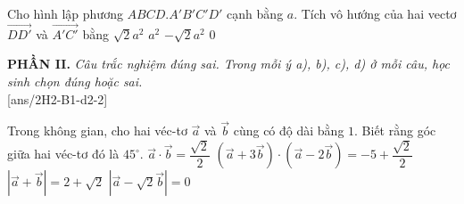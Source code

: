 \begin{ex}
	Cho hình lập phương $ABCD.A'B'C'D'$ cạnh bằng $a$. Tích vô hướng của hai vectơ $\vec{DD'}$ và $\vec{A'C'}$ bằng
	\choice
	{$\sqrt{2}a^2$}
	{$a^2$}
	{$-\sqrt{2}a^2$}
	{\True $0$}
\end{ex}
\textbf{PHẦN II.} \textit{Câu trắc nghiệm đúng sai. Trong mỗi ý a), b), c), d) ở mỗi câu, học sinh chọn đúng hoặc sai.}\\
[ans/2H2-B1-d2-2]
\begin{ex}%
	Trong không gian, cho hai véc-tơ $\vec{a}$ và $\vec{b}$ cùng có độ dài bằng $1$. Biết rằng góc giữa hai véc-tơ đó là $45^{\circ}$.
	\choiceTF
	{\True $\vec{a}\cdot \vec{b}=\dfrac{\sqrt{2}}{2}$}
	{\True $\left( \vec{a}+3 \vec{b}\right) \cdot\left( \vec{a}-2 \vec{b}\right)=-5+\dfrac{\sqrt{2}}{2}$}
	{$\left| \vec{a}+ \vec{b}\right|=2+\sqrt{2} $}
	{$\left| \vec{a}-\sqrt{2}\vec{b}\right|=0$}
\end{ex} 
